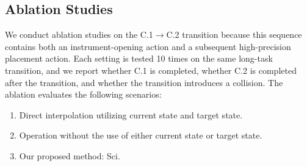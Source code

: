 \documentclass[letterpaper]{article} %
\begin{document}

\subsection{Ablation Studies}
We conduct ablation studies on the C.1$\rightarrow$C.2 transition because this sequence contains both an instrument-opening action and a subsequent high-precision placement action. Each setting is tested 10 times on the same long-task transition, and we report whether C.1 is completed, whether C.2 is completed after the transition, and whether the transition introduces a collision. The ablation evaluates the following scenarios:
\begin{enumerate}
    \item Direct interpolation utilizing current state and target state.
    \item Operation without the use of either current state or target state.
    \item Our proposed method: Sci.
\end{enumerate}
\end{document}
